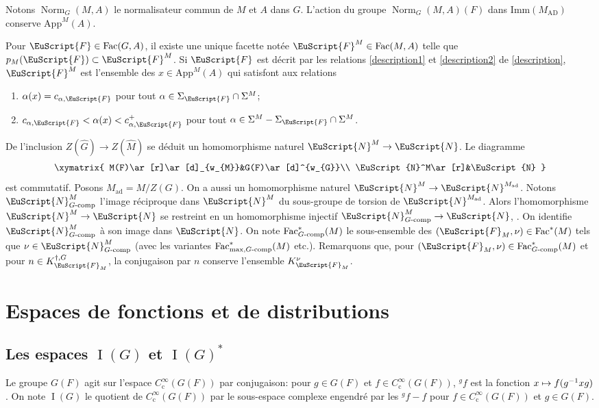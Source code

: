 \documentclass[JEP,XML,SOM,Unicode,francais]{cedram}
\let\mathcal \EuScript
\newcommand\mto{\mathchoice{\longmapsto}{\mapsto}{\mapsto}{\mapsto}}
\newcommand{\gf}{{}^g\!f}
\newcommand{\AD}{\mathrm{AD}}
\newcommand{\App}{\mathrm{App}}
\newcommand{\rc}{\mathrm{c}}
\newcommand{\tcomp}{\textup{-comp}}
\newcommand{\Fac}{\mathrm{Fac}}
\newcommand{\Imm}{\mathrm{Imm}}
\DeclareMathOperator{\ad}{ad}
\DeclareMathOperator{\rI}{I}
\DeclareMathOperator{\Norm}{Norm}
\newcommand{\cF}{\mathcal{F}}
\newcommand{\cN}{\mathcal{N}}
\theoremstyle{plain}
\theoremstyle{definition}
\begin{document}
Notons $\Norm_{G}(M,A)$ le normalisateur commun de $M$ et $A$ dans $G$. L'action du groupe $\Norm_{G}(M,A)(F)$ dans $\Imm(M_{\AD})$ conserve $\App^M(A)$.

Pour $\cF\in \Fac(G,A)$, il existe une unique facette notée $\cF^{M}\in \Fac(M,A)$ telle que $p_{M}(\cF)\subset \cF^{M}$. Si $\cF$ est décrit par les relations \eqref{description1} et \eqref{description2} de \ref{description}, $\cF^{M}$ est l'ensemble des $x\in \App^M(A)$ qui satisfont aux relations
\begin{enumerate}
\item\label{groupesdelevi1}
$\alpha(x)=c_{\alpha,\cF}$ pour tout $\alpha\in \Sigma_{\cF}\cap \Sigma^M$;

\item\label{groupesdelevi2}
$c_{\alpha,\cF}<\alpha(x)<c_{\alpha,\cF}^+$ pour tout $\alpha\in \Sigma^M-\Sigma_{\cF}\cap \Sigma^M$.
\end{enumerate}

De l'inclusion $Z(\hat{G})\to Z(\hat{M})$ se déduit un homomorphisme naturel $\cN^M\to \cN$. Le diagramme
\[
\xymatrix{
M(F)\ar[r]\ar[d]_{w_{M}}&G(F)\ar[d]^{w_{G}}\\
\cN^M\ar[r]&\cN
}
\]
est commutatif. Posons $M_{\ad}=M/Z(G)$. On a aussi un homomorphisme naturel $\cN^M\to \cN^{M_{\ad}}$. Notons $\cN_{G\tcomp}^M$ l'image réciproque dans $\cN^M$ du sous-groupe de torsion de $\cN^{M_{\ad}}$. Alors l'homomorphisme $\cN^M\to \cN$ se restreint en un homomorphisme injectif $\cN^M_{G\tcomp}\to \cN$, \cf \cite[6(1)]{W2}. On identifie $\cN^M_{G\tcomp}$ à son image dans $\cN$. On note $\Fac^*_{G\tcomp}(M)$ le sous-ensemble des $(\cF_{M},\nu)\in \Fac^*(M)$ tels que $\nu\in \cN^M_{G\tcomp}$ (avec les variantes $\Fac^*_{\max,G\tcomp}(M)$ etc.). Remarquons que, pour $(\cF_{M},\nu)\in \Fac^*_{G\tcomp}(M)$ et pour $n\in K_{\cF_{M}}^{\dag,G}$, la conjugaison par $n$ conserve l'ensemble $K_{\cF_{M}}^{\nu}$.

\section{Espaces de fonctions et de distributions}

\subsection{Les espaces \texorpdfstring{$\rI(G)$ et $\rI(G)^*$}{GetG}}\label{lesespaces}

Le groupe $G(F)$ agit sur l'espace $C_{\rc}^{\infty}(G(F))$ par conjugaison: pour $g\in G(F)$ et $f\in C_{\rc}^{\infty}(G(F))$, $\gf$ est la fonction $x\mto f(g^{-1}xg)$. On note $\rI(G)$ le quotient de $C_{\rc}^{\infty}( G(F))$ par le sous-espace complexe engendré par les $\gf-f$ pour $f\in C_{\rc}^{\infty}(G(F))$ et $g\in G(F)$.
\end{document}
